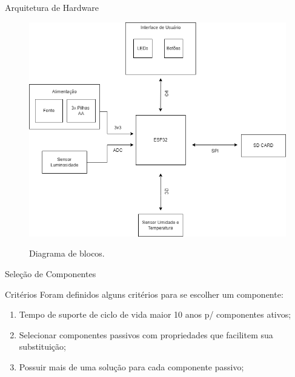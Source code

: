 \begin{frame}{Arquitetura de Hardware}

    \begin{figure}
        \centering
        \caption{Diagrama de blocos.}
        \includegraphics[scale=0.3]{figuras/cap3/datalogger_tcc.png}
        \label{fig:block_diagram}
    \end{figure}
    
\end{frame}


\begin{frame}{Seleção de Componentes}

    \begin{block}{Critérios}
        Foram definidos alguns critérios para se escolher um componente:
        
        \begin{enumerate}
            
            \item Tempo de suporte de ciclo de vida maior 10 anos p/ componentes ativos;
            \item Selecionar componentes passivos com propriedades que facilitem sua substituição;
            \item Possuir mais de uma solução para cada componente passivo;
            
        \end{enumerate}
    
        
    \end{block}

\end{frame}

